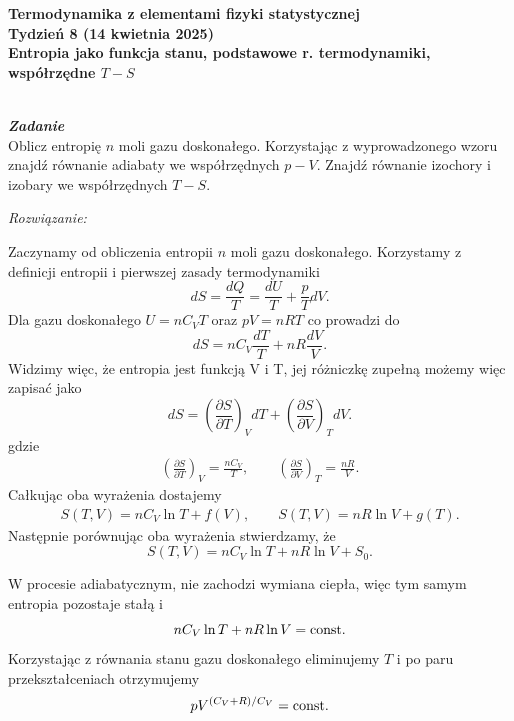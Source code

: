 \documentclass[11pt,a4paper]{article}
\newcounter{zadanie}\newcommand{\zadanie}[1][]{\addtocounter{zadanie}{1} ~\\  {\bf \emph{Zadanie \arabic{zadanie} #1 }} \\}
\begin{document}

\begin{centering}
\bf{\Large{Termodynamika z elementami fizyki statystycznej}}\\
Tydzień 8 (14 kwietnia 2025)\\[3mm]
Entropia jako funkcja stanu, podstawowe r. termodynamiki, współrzędne $T-S$\\
\end{centering} 
\vspace{5mm}

\zadanie
Oblicz entropię $n$ moli gazu doskonałego. Korzystając z wyprowadzonego
wzoru znajdź równanie adiabaty we współrzędnych $p - V$.
Znajdź równanie izochory  i izobary we współrzędnych $T-S$.


\vspace{5mm}
{\em Rozwiązanie:}

Zaczynamy od obliczenia entropii $n$ moli gazu doskonałego.
Korzystamy z definicji entropii i pierwszej zasady termodynamiki
\begin{equation}
	dS = \frac{dQ}{T} = \frac{dU}{T} + \frac{p}{T}dV.
\end{equation}
Dla gazu doskonałego $U = n C_V T$ oraz $p V = nRT$ co prowadzi do 
\begin{equation}
	dS = n C_V \frac{dT}{T} + n R \frac{dV}{V}.
\end{equation}
Widzimy więc, że entropia jest funkcją V i T, jej różniczkę zupełną możemy więc zapisać jako
\begin{equation}
	dS = \left(\frac{\partial S}{\partial T} \right)_V dT + \left(\frac{\partial S}{\partial V} \right)_T dV.
\end{equation}
gdzie
\begin{align}
	\left(\frac{\partial S}{\partial T} \right)_V = \frac{n C_V}{T}, \qquad  \left(\frac{\partial S}{\partial V} \right)_T = \frac{nR}{V}.
\end{align}
Całkując oba wyrażenia dostajemy
\begin{align}
	S(T,V) = n C_V \ln T + f(V), \qquad S(T,V) = n R \ln V + g(T).
\end{align}
Następnie porównując oba wyrażenia stwierdzamy, że
\begin{equation}
	S(T,V) = n C_V \ln T + n R \ln V + S_0.
\end{equation}

W procesie adiabatycznym, nie zachodzi wymiana ciepła, więc tym samym entropia pozostaje stałą i
\begin{equation}
	n C_V \ln T + n R \ln V = {\rm const}.
\end{equation}
Korzystając z równania stanu gazu doskonałego eliminujemy $T$ i po paru przekształceniach otrzymujemy
\begin{equation}
	p V^{(C_V + R)/C_V} = {\rm const}.
\end{equation}
\end{document}
